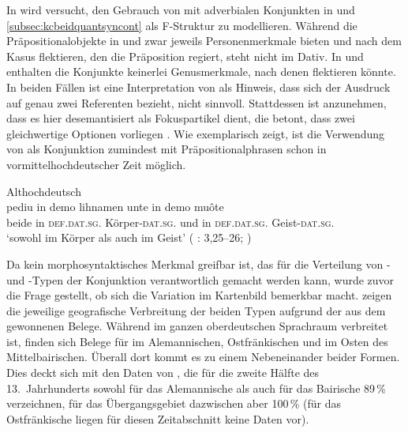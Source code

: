 In  wird versucht, den Gebrauch von  mit
adverbialen Konjunkten in  und
\ref{subsec:kcbeidquantsyncont} als F-Struktur zu modellieren. Während die
Präpositionalobjekte in  und 
zwar jeweils Personenmerkmale bieten und nach dem Kasus flektieren, den die
Präposition regiert, steht  nicht im Dativ. In
 und  enthalten die Konjunkte
keinerlei Genusmerkmale, nach denen  flektieren könnte. In beiden
Fällen ist eine Interpretation von  als Hinweis, dass sich der
Ausdruck auf genau zwei Referenten bezieht, nicht sinnvoll. Stattdessen ist
anzunehmen, dass es hier desemantisiert als Fokuspartikel dient, die betont,
dass zwei gleichwertige Optionen vorliegen
\autocite[425--428]{johannessen2005}. Wie 
exemplarisch zeigt, ist die Verwendung von  als Konjunktion
zumindest mit Präpositionalphrasen schon in vormittelhochdeutscher Zeit
möglich.

\begin{exe}
\ex \label{ex:beideintiahd_3_copy}
	Althochdeutsch\\
	\gll pediu in demo lihnamen unte in demo muôte \\
		beide in \textsc{def.dat.sg.\MascI} Körper-\textsc{dat.sg.\MascI} und in
			\textsc{def.dat.sg.\MascI} Geist-\textsc{dat.sg.\MascI} \\
	\trans `sowohl im Körper als auch im Geist'
		(%
			: 3,25--26;
			\cite[171]{steinmeyer1916}%
		)
\end{exe}

Da kein morphosyntaktisches Merkmal greifbar ist, das für die Verteilung von
- und -Typen der Konjunktion verantwortlich gemacht
werden kann, wurde zuvor die Frage gestellt, ob sich die Variation im
Kartenbild bemerkbar macht.
 zeigen die jeweilige
geografische Verbreitung der beiden Typen aufgrund der aus dem \CAO{} gewonnenen
Belege. Während  im ganzen oberdeutschen Sprachraum verbreitet
ist, finden sich Belege für  im Alemannischen, Ostfränkischen und
im Osten des Mittelbairischen. Überall dort kommt es zu einem Nebeneinander
beider Formen. Dies deckt sich mit den Daten von \citet[627]{ksw2}, die für die
zweite Hälfte des 13.~Jahrhunderts sowohl für das Alemannische als auch für das
Bairische 89\,\%  verzeichnen, für das Übergangsgebiet dazwischen
aber 100\,\% (für das Ostfränkische liegen für diesen Zeitabschnitt keine Daten
vor).

